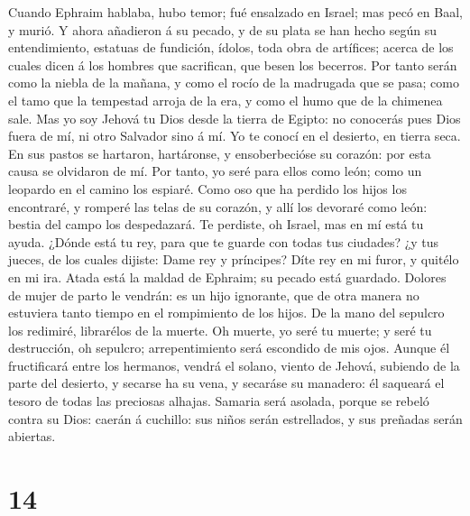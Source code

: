  Cuando Ephraim hablaba, hubo temor; fué ensalzado en
Israel; mas pecó en Baal, y murió.  Y ahora añadieron á su
pecado, y de su plata se han hecho según su entendimiento, estatuas de
fundición, ídolos, toda obra de artífices; acerca de los cuales dicen á
los hombres que sacrifican, que besen los becerros.  Por
tanto serán como la niebla de la mañana, y como el rocío de la madrugada
que se pasa; como el tamo que la tempestad arroja de la era, y como el
humo que de la chimenea sale.  Mas yo soy Jehová tu Dios
desde la tierra de Egipto: no conocerás pues Dios fuera de mí, ni otro
Salvador sino á mí.  Yo te conocí en el desierto, en tierra
seca.  En sus pastos se hartaron, hartáronse, y
ensoberbecióse su corazón: por esta causa se olvidaron de mí.
 Por tanto, yo seré para ellos como león; como un leopardo
en el camino los espiaré.  Como oso que ha perdido los hijos
los encontraré, y romperé las telas de su corazón, y allí los devoraré
como león: bestia del campo los despedazará.  Te perdiste,
oh Israel, mas en mí está tu ayuda.  ¿Dónde está tu rey,
para que te guarde con todas tus ciudades? ¿y tus jueces, de los cuales
dijiste: Dame rey y príncipes?  Díte rey en mi furor, y
quitélo en mi ira.  Atada está la maldad de Ephraim; su
pecado está guardado.  Dolores de mujer de parto le
vendrán: es un hijo ignorante, que de otra manera no estuviera tanto
tiempo en el rompimiento de los hijos.  De la mano del
sepulcro los redimiré, librarélos de la muerte. Oh muerte, yo seré tu
muerte; y seré tu destrucción, oh sepulcro; arrepentimiento será
escondido de mis ojos.  Aunque él fructificará entre los
hermanos, vendrá el solano, viento de Jehová, subiendo de la parte del
desierto, y secarse ha su vena, y secaráse su manadero: él saqueará el
tesoro de todas las preciosas alhajas.  Samaria será
asolada, porque se rebeló contra su Dios: caerán á cuchillo: sus niños
serán estrellados, y sus preñadas serán abiertas.

\hypertarget{section-13}{%
\section{14}\label{section-13}}


